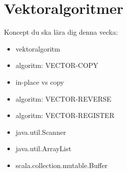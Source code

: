 \chapter{Vektoralgoritmer}\label{chapter:W05}
Koncept du ska lära dig denna vecka:
\begin{multicols}{2}\begin{itemize}[nosep,label={$\square$},leftmargin=*]
\item vektoralgoritm
\item algoritm: VECTOR-COPY
\item in-place vs copy
\item algoritm: VECTOR-REVERSE
\item algoritm: VECTOR-REGISTER
\item java.util.Scanner
\item java.util.ArrayList
\item scala.collection.mutable.Buffer\end{itemize}\end{multicols}
